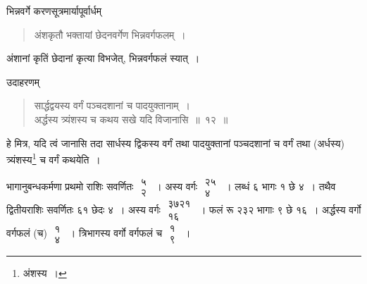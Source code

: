 \documentclass[10pt, openany]{book}
\begin{document}
{भिन्नवर्गे करणसूत्रमार्यापूर्वार्धम्\textemdash}

\begin{quote}
{\bs  अंशकृतौ भक्तायां छेदनवर्गेण भिन्नवर्गफलम्~।}
\end{quote}

{अंशानां कृतिं छेदानां कृत्या विभजेत्, भिन्नवर्गफलं स्यात्~।}
\vspace{2mm}

{उदाहरणम्\textemdash}

\begin{quote}
    {\eg सार्द्धद्वयस्य वर्गं पञ्चदशानां च पादयुक्तानाम्~। \\      
      अर्द्धस्य त्र्यंशस्य च कथय सखे यदि विजानासि~॥~१२~॥}\end{quote} 

{हे मित्र, यदि त्वं जानासि तदा सार्धस्य द्विकस्य वर्गं तथा पादयुक्तानां
पञ्चदशानां च वर्गं तथा (अर्धस्य) त्र्यंशस्य\renewcommand{\thefootnote}{\s २}\footnote{\s अंशस्य~।} च वर्गं कथयेति~।} 
\vspace{2mm}

{भागानुबन्धकर्मणा प्रथमो राशिः सवर्णितः $\begin{matrix}

\mbox{{५}}\\

\mbox{{२}}

\end{matrix}$~। अस्य वर्गः $\begin{matrix}

\mbox{{२५}}\\

\mbox{{४}}

\end{matrix}$~। लब्धं ६ भागः १}
{छे ४~। तथैव द्वितीयराशिः सवर्णितः ६१ छेदः ४~। अस्य वर्गः $\begin{matrix}

\mbox{{३७२१}}\\

\mbox{{१६}}

\end{matrix}$~।
फलं रू २३२}
{भागाः ९ छे १६~। अर्द्धस्य वर्गो वर्गफलं (च) $\begin{matrix}

\mbox{{१}}\\

\mbox{{४}}

\end{matrix}$~। त्रिभागस्य वर्गो
वर्गफलं च $\begin{matrix}

\mbox{{१}}\\

\mbox{{९}}

\end{matrix}$~।}
\vspace{2mm}
\end{document}
